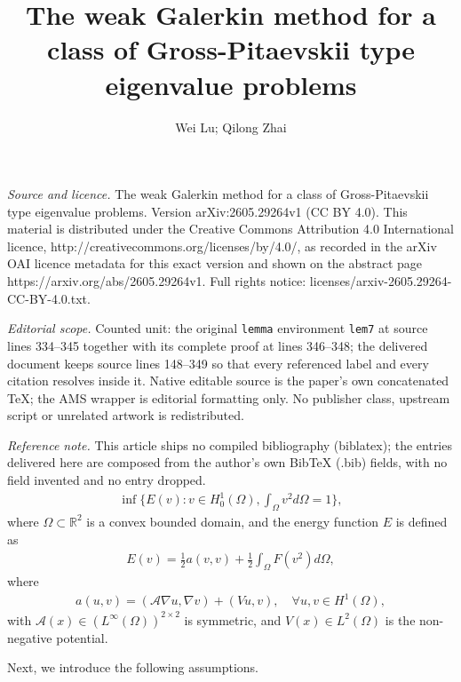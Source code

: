 \documentclass[10pt,a4paper]{amsart}
\numberwithin{equation}{section}
\newcommand{\A}{\mathcal{A}}
\newcommand{\Real}{\mathbb{R}}
\begin{document}
\title[The weak Galerkin method for a class of Gross-Pitaevskii typ]{The weak Galerkin method for a class of Gross-Pitaevskii type eigenvalue problems}
\author{Wei Lu; Qilong Zhai}
\date{}
\maketitle
\noindent\emph{Source and licence.} The weak Galerkin method for a class of Gross-Pitaevskii type eigenvalue problems. Version arXiv:2605.29264v1 (CC BY 4.0). This material is distributed under the Creative Commons Attribution 4.0 International licence, http://creativecommons.org/licenses/by/4.0/, as recorded in the arXiv OAI licence metadata for this exact version and shown on the abstract page https://arxiv.org/abs/2605.29264v1. Full rights notice: licenses/arxiv-2605.29264-CC-BY-4.0.txt.\par\smallskip
\noindent\textit{Editorial scope.} Counted unit: the original \texttt{lemma} environment \texttt{lem7} at source lines 334--345 together with its complete proof at lines 346--348; the delivered document keeps source lines 148--349 so that every referenced label and every citation resolves inside it. Native editable source is the paper's own concatenated TeX; the AMS wrapper is editorial formatting only. No publisher class, upstream script or unrelated artwork is redistributed.
\par\smallskip\noindent\textit{Reference note.} This article ships no compiled bibliography (biblatex); the entries delivered here are composed from the author's own BibTeX (.bib) fields, with no field invented and no entry dropped.
\begin{eqnarray}\label{1.1}
	\inf\{E(v):v\in H_0^1(\Omega),\displaystyle\int_\Omega v^2 d\Omega=1\},
\end{eqnarray}
where $\Omega\subset\Real^2$ is a convex bounded domain, and the energy function $E$ is defined as
\begin{eqnarray}\label{E}
	E(v)=\frac12 a(v,v)+\frac12\displaystyle\int_\Omega F(v^2)d\Omega,
\end{eqnarray}
where
\begin{eqnarray*}
	a(u,v)=(\A\nabla u,\nabla v)+(Vu,v),\quad\forall u,v\in H^1(\Omega),
\end{eqnarray*}
with $\A(x)\in (L^\infty(\Omega))^{2\times2}$ is symmetric, and 
$V(x)\in L^2(\Omega)$ is the non-negative potential.

Next, we introduce the following assumptions.
\end{document}
